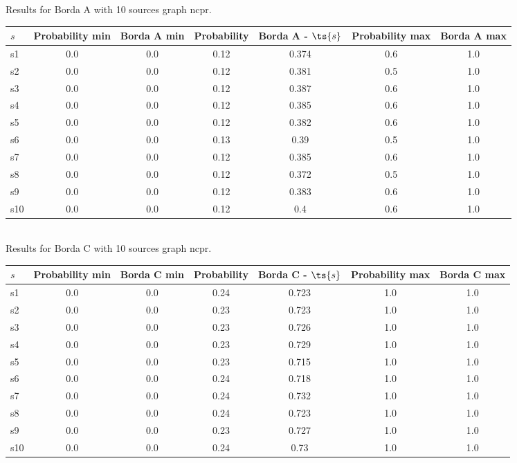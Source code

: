 \documentclass{article}
\begin{document}
\noindent Results for Borda A with 10 sources graph ncpr.

\noindent\begin{tabular}{|l|c|c|c|c|c|c|}
\hline
$s$& Probability min & Borda A min & Probability & Borda A - $\ts{s}$ & Probability max & Borda A max\\
\hline
s1 &0.0 & 0.0 & 0.12 & 0.374 & 0.6 & 1.0\\
\hline
s2 &0.0 & 0.0 & 0.12 & 0.381 & 0.5 & 1.0\\
\hline
s3 &0.0 & 0.0 & 0.12 & 0.387 & 0.6 & 1.0\\
\hline
s4 &0.0 & 0.0 & 0.12 & 0.385 & 0.6 & 1.0\\
\hline
s5 &0.0 & 0.0 & 0.12 & 0.382 & 0.6 & 1.0\\
\hline
s6 &0.0 & 0.0 & 0.13 & 0.39 & 0.5 & 1.0\\
\hline
s7 &0.0 & 0.0 & 0.12 & 0.385 & 0.6 & 1.0\\
\hline
s8 &0.0 & 0.0 & 0.12 & 0.372 & 0.5 & 1.0\\
\hline
s9 &0.0 & 0.0 & 0.12 & 0.383 & 0.6 & 1.0\\
\hline
s10 &0.0 & 0.0 & 0.12 & 0.4 & 0.6 & 1.0\\
\hline
\end{tabular}\\

\noindent Results for Borda C with 10 sources graph ncpr.

\noindent\begin{tabular}{|l|c|c|c|c|c|c|}
\hline
$s$& Probability min & Borda C min & Probability & Borda C - $\ts{s}$ & Probability max & Borda C max\\
\hline
s1 &0.0 & 0.0 & 0.24 & 0.723 & 1.0 & 1.0\\
\hline
s2 &0.0 & 0.0 & 0.23 & 0.723 & 1.0 & 1.0\\
\hline
s3 &0.0 & 0.0 & 0.23 & 0.726 & 1.0 & 1.0\\
\hline
s4 &0.0 & 0.0 & 0.23 & 0.729 & 1.0 & 1.0\\
\hline
s5 &0.0 & 0.0 & 0.23 & 0.715 & 1.0 & 1.0\\
\hline
s6 &0.0 & 0.0 & 0.24 & 0.718 & 1.0 & 1.0\\
\hline
s7 &0.0 & 0.0 & 0.24 & 0.732 & 1.0 & 1.0\\
\hline
s8 &0.0 & 0.0 & 0.24 & 0.723 & 1.0 & 1.0\\
\hline
s9 &0.0 & 0.0 & 0.23 & 0.727 & 1.0 & 1.0\\
\hline
s10 &0.0 & 0.0 & 0.24 & 0.73 & 1.0 & 1.0\\
\hline
\end{tabular}\\
\end{document}
